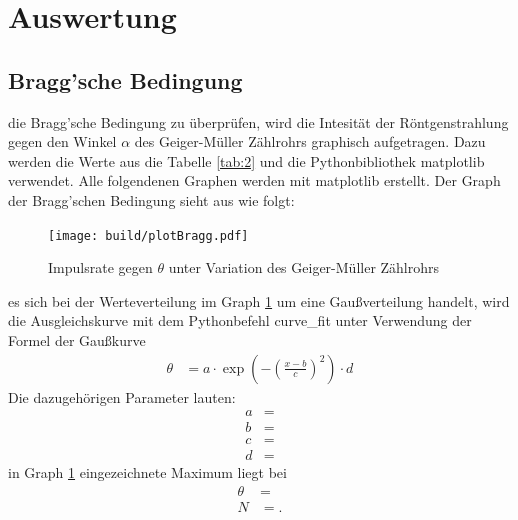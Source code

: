 \section{Auswertung}

\subsection{Bragg'sche Bedingung}

    \justifying die Bragg'sche Bedingung zu überprüfen, wird die Intesität der Röntgenstrahlung gegen den Winkel $\alpha$ des
    Geiger-Müller Zählrohrs graphisch aufgetragen. Dazu werden die Werte aus die Tabelle \ref{tab:2} und die Pythonbibliothek matplotlib 
    \cite{matplotlib} verwendet. Alle folgendenen Graphen werden mit matplotlib erstellt. Der Graph der Bragg'schen Bedingung sieht aus wie
    folgt:

    \begin{figure}[H]
        \centering
        \texttt{[image: build/plotBragg.pdf]}
        \caption{Impulsrate gegen $\theta$ unter Variation des Geiger-Müller Zählrohrs}
        \label{fig:2}
    \end{figure}

    \justifying es sich bei der Werteverteilung im Graph \ref{fig:2} um eine Gaußverteilung handelt, wird die Ausgleichskurve 
    mit dem Pythonbefehl curve\_fit \cite{matplotlib} unter Verwendung der Formel der Gaußkurve
    \begin{align}
        \theta &= a\cdot \exp\left(-\left(\frac{x-b}{c}\right)^2\right)\cdot d \label{eq:8}
    \end{align}
    \justifying Die dazugehörigen Parameter lauten:
    \begin{subequations}\label{eq:9}
        \begin{align}
            a &= \text{} \label{eq:9a}\\
            b &= \text{} \label{eq:9b}\\
            c &= \text{} \label{eq:9c}\\
            d &= \text{} \label{eq:9d}
        \end{align}
    \end{subequations}
    \justifying in Graph \ref{fig:2} eingezeichnete Maximum liegt bei 
    \begin{subequations}\label{eq:10}
    \begin{align}
        \theta &= \text{} \label{eq:10a}\\
        N &= \text{}. \label{eq:10b}
    \end{align}
    \end{subequations}


